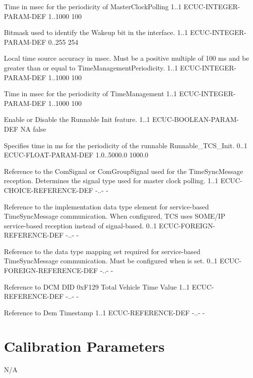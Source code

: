 {
{Time in msec for the periodicity of MasterClockPolling}
{1..1}
{ECUC-INTEGER-PARAM-DEF}
{1..1000}
{100}

{Bitmask used to identify the Wakeup bit in the  interface.}
{1..1}
{ECUC-INTEGER-PARAM-DEF}
{0..255}
{254}

{Local time source accuracy in msec. Must be a positive multiple of 100 ms and be greater than or equal to TimeManagementPeriodicity.}
{1..1}
{ECUC-INTEGER-PARAM-DEF}
{1..1000}
{100}

{Time in msec for the periodicity of TimeManagement}
{1..1}
{ECUC-INTEGER-PARAM-DEF}
{1..1000}
{100}

{Enable or Disable the Runnable Init feature.}
{1..1}
{ECUC-BOOLEAN-PARAM-DEF}
{NA}
{false}

{Specifies time in ms for the periodicity of the runnable Runnable_TCS_Init.}
{0..1}
{ECUC-FLOAT-PARAM-DEF}
{1.0..5000.0}
{1000.0}

{Reference to the ComSignal or ComGroupSignal used for the TimeSyncMessage reception. Determines the signal type used for master clock polling.}
{1..1}
{ECUC-CHOICE-REFERENCE-DEF}
{-..-}
{-}

{Reference to the implementation data type element for service-based TimeSyncMessage communication. When configured, TCS uses SOME/IP service-based reception instead of signal-based.}
{0..1}
{ECUC-FOREIGN-REFERENCE-DEF}
{-..-}
{-}

{Reference to the data type mapping set required for service-based TimeSyncMessage communication. Must be configured when  is set.}
{0..1}
{ECUC-FOREIGN-REFERENCE-DEF}
{-..-}
{-}

{Reference to DCM DID 0xF129 Total Vehicle Time Value}
{1..1}
{ECUC-REFERENCE-DEF}
{-..-}
{-}

{Reference to Dem Timestamp}
{1..1}
{ECUC-REFERENCE-DEF}
{-..-}
{-}
}
{}
\section{Calibration Parameters}
N/A
